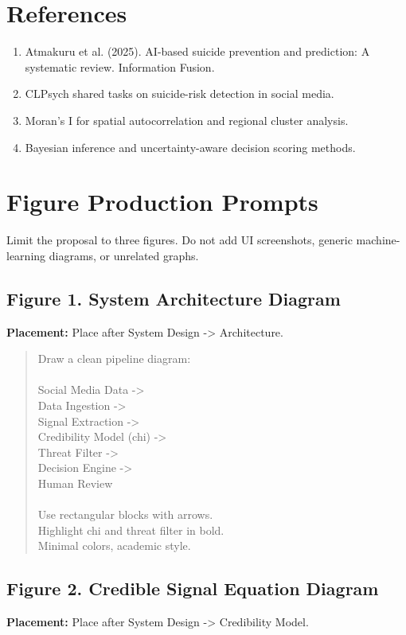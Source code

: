 \documentclass[11pt]{article}
\begin{document}
\section{References}

\begin{enumerate}[leftmargin=*]
\item Atmakuru et al. (2025). AI-based suicide prevention and prediction: A systematic review. Information Fusion.
\item CLPsych shared tasks on suicide-risk detection in social media.
\item Moran's I for spatial autocorrelation and regional cluster analysis.
\item Bayesian inference and uncertainty-aware decision scoring methods.
\end{enumerate}

\section{Figure Production Prompts}

Limit the proposal to three figures. Do not add UI screenshots, generic machine-learning diagrams, or unrelated graphs.

\subsection*{Figure 1. System Architecture Diagram}
\textbf{Placement:} Place after System Design -> Architecture.

\begin{quote}
\ttfamily
Draw a clean pipeline diagram:\\\\Social Media Data ->\\Data Ingestion ->\\Signal Extraction ->\\Credibility Model (chi) ->\\Threat Filter ->\\Decision Engine ->\\Human Review\\\\Use rectangular blocks with arrows.\\Highlight chi and threat filter in bold.\\Minimal colors, academic style.
\end{quote}

\subsection*{Figure 2. Credible Signal Equation Diagram}
\textbf{Placement:} Place after System Design -> Credibility Model.
\end{document}
